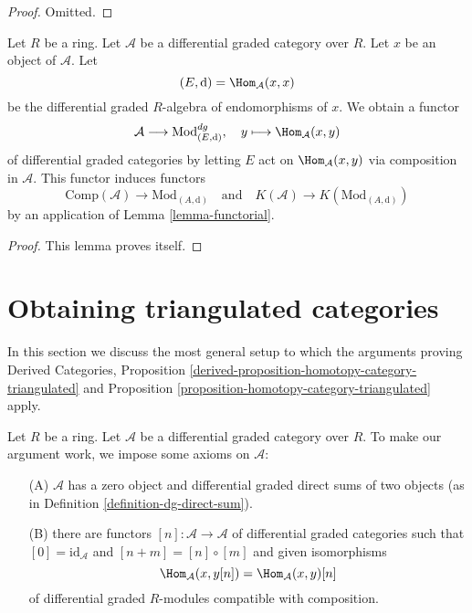 \begin{proof}
Omitted.
\end{proof}

\begin{lemma}
\label{lemma-construction}
Let $R$ be a ring. Let $\mathcal{A}$ be a differential graded category
over $R$. Let $x$ be an object of $\mathcal{A}$. Let
$$
(E, \text{d}) = \Hom_\mathcal{A}(x, x)
$$
be the differential graded $R$-algebra of endomorphisms of $x$.
We obtain a functor
$$
\mathcal{A} \longrightarrow \text{Mod}^{dg}_{(E, \text{d})},\quad
y \longmapsto \Hom_\mathcal{A}(x, y)
$$
of differential graded categories by letting $E$ act on
$\Hom_\mathcal{A}(x, y)$ via composition in $\mathcal{A}$.
This functor induces functors
$$
\text{Comp}(\mathcal{A}) \to \text{Mod}_{(A, \text{d})}
\quad\text{and}\quad
K(\mathcal{A}) \to K(\text{Mod}_{(A, \text{d})})
$$
by an application of Lemma \ref{lemma-functorial}.
\end{lemma}

\begin{proof}
This lemma proves itself.
\end{proof}









\section{Obtaining triangulated categories}
\label{section-review}

\noindent
In this section we discuss the most general setup to which the arguments
proving Derived Categories, Proposition
\ref{derived-proposition-homotopy-category-triangulated} and
Proposition \ref{proposition-homotopy-category-triangulated} apply.

\medskip\noindent
Let $R$ be a ring. Let $\mathcal{A}$ be a differential graded category
over $R$. To make our argument work, we impose some axioms on $\mathcal{A}$:
\begin{enumerate}
\item[(A)] $\mathcal{A}$ has a zero object and differential
graded direct sums of two objects
(as in Definition \ref{definition-dg-direct-sum}).
\item[(B)] there are functors $[n] : \mathcal{A} \longrightarrow \mathcal{A}$
of differential graded categories such that
$[0] = \text{id}_\mathcal{A}$ and $[n + m] = [n] \circ [m]$
and given isomorphisms
$$
\Hom_\mathcal{A}(x, y[n]) = \Hom_\mathcal{A}(x, y)[n]
$$
of differential graded $R$-modules compatible with composition.
\end{enumerate}

